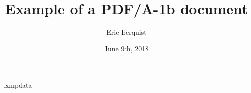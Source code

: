\begin{filecontents*}{\jobname.xmpdata}
\end{filecontents*}

\documentclass[12pt]{report}

\usepackage{iftex}
\ifPDFTeX
   \usepackage[utf8]{inputenc}
   \usepackage[T1]{fontenc}
   \usepackage{lmodern}
\else
   \ifXeTeX
     \usepackage{fontspec}
   \else
     \usepackage{luatextra}
   \fi
\fi

\usepackage{lipsum}
\makeatletter
\newcommand\singlelipsum[1]{%
  \begingroup\let\lips@par\relax\csname lipsum@\@roman{#1}\endcsname
\endgroup }
\makeatother

\usepackage[a-1b]{pdfx}

\usepackage{hyperref}
\hypersetup{pdfencoding=unicode}

\title{Example of a PDF/A-1b document}
\author{Eric Berquist}
\date{June 9th, 2018}



\begin{titlepage}
\maketitle
\end{titlepage}

\chapter{First chapter}

\section{First section}

\singlelipsum{1}

\singlelipsum{2}

\section{Second section}

\singlelipsum{3}

\singlelipsum{4}


